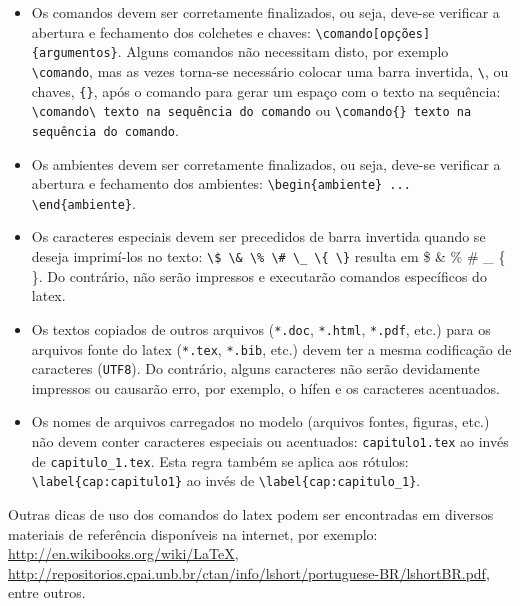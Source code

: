 \begin{itemize}%
\item Os comandos devem ser corretamente finalizados, ou seja, deve-se verificar a abertura e fechamento dos colchetes e chaves: \verb|\comando[opções]{argumentos}|. Alguns comandos não necessitam disto, por exemplo \verb|\comando|, mas as vezes torna-se necessário colocar uma barra invertida, \verb|\|, ou chaves, \verb|{}|, após o comando para gerar um espaço com o texto na sequência: \verb|\comando\ texto na sequência do comando| ou \verb|\comando{} texto na sequência do comando|.
\item Os ambientes devem ser corretamente finalizados, ou seja, deve-se verificar a abertura e fechamento dos ambientes: \verb|\begin{ambiente} ... \end{ambiente}|.
\item Os caracteres especiais devem ser precedidos de barra invertida quando se deseja imprimí-los no texto: \verb|\$ \& \% \# \_ \{ \}| resulta em \$ \& \% \# \_ \{ \}. Do contrário, não serão impressos e executarão comandos específicos do \gls{latex}.
\item Os textos copiados de outros arquivos (\texttt{*.doc}, \texttt{*.html}, \texttt{*.pdf}, etc.) para os arquivos fonte do \gls{latex} (\texttt{*.tex}, \texttt{*.bib}, etc.) devem ter a mesma codificação de caracteres (\texttt{UTF8}). Do contrário, alguns caracteres não serão devidamente impressos ou causarão erro, por exemplo, o hífen e os caracteres acentuados.
\item Os nomes de arquivos carregados no modelo (arquivos fontes, figuras, etc.) não devem conter caracteres especiais ou acentuados: \verb|capitulo1.tex| ao invés de \verb|capitulo_1.tex|. Esta regra também se aplica aos rótulos: \verb|\label{cap:capitulo1}| ao invés de \verb|\label{cap:capitulo_1}|.
\end{itemize}

Outras dicas de uso dos comandos do \gls{latex} podem ser encontradas em diversos materiais de referência disponíveis na internet, por exemplo: \url{http://en.wikibooks.org/wiki/LaTeX}, \url{http://repositorios.cpai.unb.br/ctan/info/lshort/portuguese-BR/lshortBR.pdf}, entre outros.
